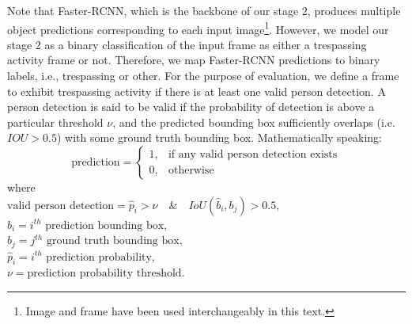 Note that Faster-RCNN, which is the backbone of our stage 2, produces multiple object predictions corresponding to each input image\footnote{Image and frame have been used interchangeably in this text.}. However, we model our stage 2 as a binary classification of the input frame as either a trespassing activity frame or not. Therefore, we map Faster-RCNN predictions to binary labels, i.e., trespassing or other. For the purpose of evaluation, we define a frame to exhibit trespassing activity if there is at least one valid person detection. A person detection is said to be valid if the probability of detection is above a particular threshold $\nu$, and the predicted bounding box sufficiently overlaps (i.e. $IOU >0.5$) with some ground truth bounding box. Mathematically speaking:
$$
\text{prediction} = 
\begin{cases}
1, &    \text{if any valid person detection exists} \\
0, &    \text{otherwise}
\end{cases}
$$
where \\
$\text{valid person detection} = \hat{p}_i>\nu \quad \& \quad IoU(\hat{b}_i,b_j)>0.5,$ \\
$\hat{b}_i =i^{th} \text{ prediction bounding box,}$ \\
$b_j =j^{th} \text{ ground truth bounding box,}$ \\
$\hat{p}_i = i^{th} \text{ prediction probability,}$ \\
$\nu =  \text{prediction probability threshold.}$


